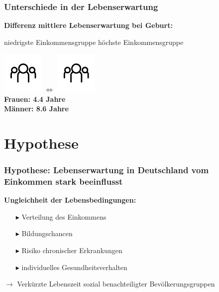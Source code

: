 \documentclass{beamer}
\begin{document}
\begin{frame}
 \frametitle{Unterschiede in der Lebenserwartung}
\textbf{Differenz mittlere Lebenserwartung bei Geburt:}

niedrigste Einkommensgruppe \hfill höchste Einkommensgruppe

\hspace{1.5cm}\includegraphics[height=2cm]{Personen}\hspace{2cm} 
$\Longleftrightarrow$ \hspace{2cm}\includegraphics[height=2cm]{Personen}\\
\vspace{0.5cm}
\hspace{4.3cm} \textbf{Frauen: 4.4 Jahre}\\
\hspace{4.3cm} \textbf{Männer: 8.6 Jahre}
     
    
\end{frame}

\section{Hypothese}
\begin{frame}
 \frametitle{Hypothese: Lebenserwartung in Deutschland vom Einkommen stark beeinflusst}
 \textbf{Ungleichheit der Lebensbedingungen:}
 \vspace{0.5cm}
 \begin{itemize}
   \item [$\blacktriangleright$] Verteilung des Einkommens
   \item [$\blacktriangleright$] Bildungschancen
   \item [$\blacktriangleright$] Risiko chronischer Erkrankungen
   \item [$\blacktriangleright$] individuelles Gesundheitsverhalten
 \end{itemize}
 \vspace{0.5cm}
 $\rightarrow$ Verkürzte Lebenszeit sozial benachteiligter Bevölkerungsgruppen
 
\end{frame}
\end{document}
